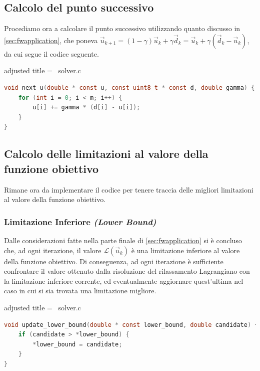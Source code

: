 \subsection{Calcolo del punto successivo}
Procediamo ora a calcolare il punto successivo utilizzando quanto discusso in \ref{sec:fwapplication}, che poneva
\(
\vec{u}_{k+1} = (1 - \gamma)\vec{u}_k + \gamma \vec{d}_k = \vec{u}_k + \gamma(\vec{d}_k - \vec{u}_k)
\),
da cui segue il codice seguente.
\begin{code}{adjusted title = {\cicon\ solver.c}}
\begin{lstlisting}[language=c, style = style, caption={Calcolo di \( \vec{u}_{k + 1} \).}]
void next_u(double * const u, const uint8_t * const d, double gamma) {
    for (int i = 0; i < m; i++) {
        u[i] += gamma * (d[i] - u[i]);
    }
}
\end{lstlisting}
\end{code}

\subsection{Calcolo delle limitazioni al valore della funzione obiettivo}
Rimane ora da implementare il codice per tenere traccia delle migliori limitazioni al valore della funzione
obiettivo.

\subsubsection{Limitazione Inferiore \textit{(Lower Bound)}}
Dalle considerazioni fatte nella parte finale di \ref{sec:fwapplication} si è concluso che, ad ogni iterazione, il
valore \( \mathcal{L}(\vec{u}_k) \) è una limitazione inferiore al valore della funzione obiettivo. Di conseguenza, ad
ogni iterazione è sufficiente confrontare il valore ottenuto dalla risoluzione del rilassamento Lagrangiano con la
limitazione inferiore corrente, ed eventualmente aggiornare quest'ultima nel caso in cui si sia trovata una limitazione
migliore.
\begin{code}{adjusted title = {\cicon\ solver.c}}
\begin{lstlisting}[language=c, style = style, caption={Aggiornamento della limitazione inferiore.}]
void update_lower_bound(double * const lower_bound, double candidate) {
    if (candidate > *lower_bound) {
        *lower_bound = candidate;
    }
}
\end{lstlisting}
\end{code}

